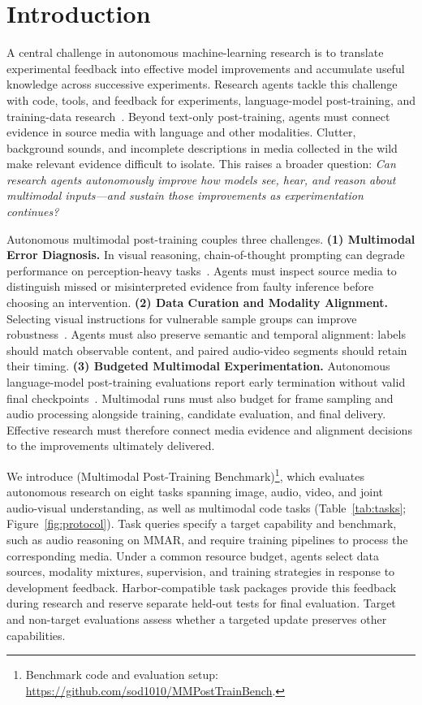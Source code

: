 \section{Introduction}
\label{sec:intro}
%
A central challenge in autonomous machine-learning research is to translate experimental feedback into effective model improvements and accumulate useful knowledge across successive experiments. Research agents tackle this challenge with code, tools, and feedback for experiments, language-model post-training, and training-data research~\citep{mlagentbench,mlebench,rebench,aiscientist,posttrainbench,rsibenchdata}. Beyond text-only post-training, agents must connect evidence in source media with language and other modalities. Clutter, background sounds, and incomplete descriptions in media collected in the wild make relevant evidence difficult to isolate. This raises a broader question: \emph{Can research agents autonomously improve how models see, hear, and reason about multimodal inputs---and sustain those improvements as experimentation continues?}

%
Autonomous multimodal post-training couples three challenges. \textbf{(1) Multimodal Error Diagnosis.} In visual reasoning, chain-of-thought prompting can degrade performance on perception-heavy tasks~\citep{mmecot}. Agents must inspect source media to distinguish missed or misinterpreted evidence from faulty inference before choosing an intervention. \textbf{(2) Data Curation and Modality Alignment.} Selecting visual instructions for vulnerable sample groups can improve robustness~\citep{ards}. Agents must also preserve semantic and temporal alignment: labels should match observable content, and paired audio-video segments should retain their timing. \textbf{(3) Budgeted Multimodal Experimentation.} Autonomous language-model post-training evaluations report early termination without valid final checkpoints~\citep{posttrainbench}. Multimodal runs must also budget for frame sampling and audio processing alongside training, candidate evaluation, and final delivery. Effective research must therefore connect media evidence and alignment decisions to the improvements ultimately delivered.

%
We introduce \benchmark{} (Multimodal Post-Training Benchmark)\footnote{Benchmark code and evaluation setup: \url{https://github.com/sod1010/MMPostTrainBench}.}, which evaluates autonomous research on eight tasks spanning image, audio, video, and joint audio-visual understanding, as well as multimodal code tasks (Table~\ref{tab:tasks}; Figure~\ref{fig:protocol}). Task queries specify a target capability and benchmark, such as audio reasoning on MMAR, and require training pipelines to process the corresponding media. Under a common resource budget, agents select data sources, modality mixtures, supervision, and training strategies in response to development feedback. Harbor-compatible task packages provide this feedback during research and reserve separate held-out tests for final evaluation. Target and non-target evaluations assess whether a targeted update preserves other capabilities.

